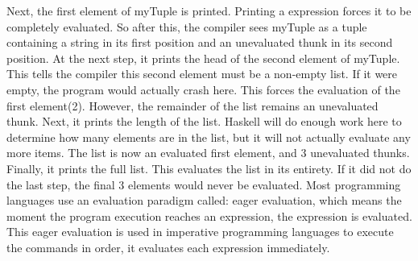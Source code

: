 \documentclass{article}
\begin{document}
\newline \newline Next, the first element of myTuple is printed. Printing a expression forces it to be completely evaluated. So after this, the compiler sees myTuple as a tuple containing a string in its first position and an unevaluated thunk in its second position.
\newline \newline At the next step, it prints the head of the second element of myTuple. This tells the compiler this second element must be a non-empty list. If it were empty, the program would actually crash here. This forces the evaluation of the first element(2). However, the remainder of the list remains an unevaluated thunk.
\newline \newline Next, it prints the length of the list. Haskell will do enough work here to determine how many elements are in the list, but it will not actually evaluate any more items. The list is now an evaluated first element, and 3 unevaluated thunks. Finally, it prints the full list. This evaluates the list in its entirety. If it did not do the last step, the final 3 elements would never be evaluated.	
\newline \newline Most programming languages use an evaluation paradigm called: eager evaluation, which means the moment the program execution reaches an expression, the expression is evaluated. This eager evaluation is used in imperative programming languages to execute the commands in order, it evaluates each expression immediately.
\end{document}
